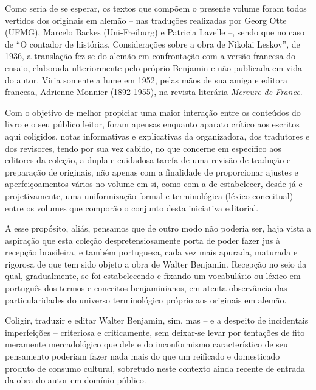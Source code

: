 Como seria de se esperar, os textos que compõem o presente volume foram
todos vertidos dos originais em alemão -- nas traduções realizadas por
Georg Otte (UFMG), Marcelo Backes (Uni-Freiburg) e Patricia Lavelle --,
sendo que no caso de ``O contador de histórias. Considerações sobre a
obra de Nikolai Leskov'', de 1936, a translação fez-se do alemão em
confrontação com a versão francesa do ensaio, elaborada ulteriormente
pelo próprio Benjamin e não publicada em vida do autor. Viria somente a
lume em 1952, pelas mãos de sua amiga e editora francesa, Adrienne
Monnier (1892-1955), na revista literária \emph{Mercure de France}.

Com o objetivo de melhor propiciar uma maior interação entre os
conteúdos do livro e o seu público leitor, foram apensas enquanto
aparato crítico aos escritos aqui coligidos, notas informativas e
explicativas da organizadora, dos tradutores e dos revisores, tendo por
sua vez cabido, no que concerne em específico aos editores da coleção, a
dupla e cuidadosa tarefa de uma revisão de tradução e preparação de
originais, não apenas com a finalidade de proporcionar ajustes e
aperfeiçoamentos vários no volume em si, como com a de estabelecer,
desde já e projetivamente, uma uniformização formal e terminológica
(léxico-conceitual) entre os volumes que comporão o conjunto desta
iniciativa editorial.

A esse propósito, aliás, pensamos que de outro modo não poderia ser,
haja vista a aspiração que esta coleção despretensiosamente porta de
poder fazer jus à recepção brasileira, e também portuguesa, cada vez
mais apurada, maturada e rigorosa de que tem sido objeto a obra de
Walter Benjamin. Recepção no seio da qual, gradualmente, se foi
estabelecendo e fixando um vocabulário ou léxico em português dos termos
e conceitos benjaminianos, em atenta observância das particularidades do
universo terminológico próprio aos originais em alemão.

Coligir, traduzir e editar Walter Benjamin, sim, mas -- e a despeito de
incidentais imperfeições -- criteriosa e criticamente, sem deixar-se
levar por tentações de fito meramente mercadológico que dele e do
inconformismo característico de seu pensamento poderiam fazer nada mais
do que um reificado e domesticado produto de consumo cultural, sobretudo
neste contexto ainda recente de entrada da obra do autor em domínio
público.

